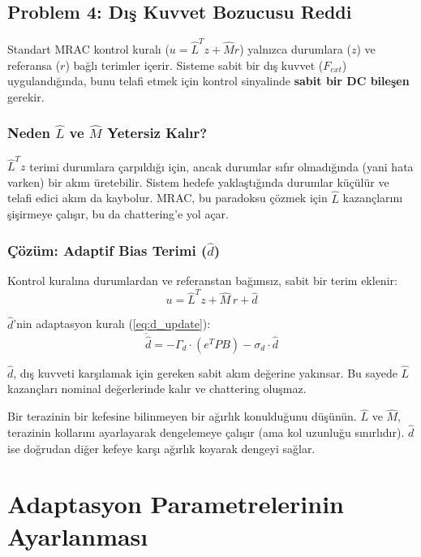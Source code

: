 \documentclass[12pt,a4paper]{article}
\begin{document}
\subsection{Problem 4: Dış Kuvvet Bozucusu Reddi}
\label{subsec:disturbance}

Standart MRAC kontrol kuralı ($u = \hat{L}^T z + \hat{M} r$) yalnızca durumlara ($z$) ve referansa ($r$) bağlı terimler içerir. Sisteme sabit bir dış kuvvet ($F_{ext}$) uygulandığında, bunu telafi etmek için kontrol sinyalinde \textbf{sabit bir DC bileşen} gerekir.

\subsubsection{Neden $\hat{L}$ ve $\hat{M}$ Yetersiz Kalır?}
$\hat{L}^T z$ terimi durumlara çarpıldığı için, ancak durumlar sıfır olmadığında (yani hata varken) bir akım üretebilir. Sistem hedefe yaklaştığında durumlar küçülür ve telafi edici akım da kaybolur. MRAC, bu paradoksu çözmek için $\hat{L}$ kazançlarını şişirmeye çalışır, bu da chattering'e yol açar.

\subsubsection{Çözüm: Adaptif Bias Terimi ($\hat{d}$)}
Kontrol kuralına durumlardan ve referanstan bağımsız, sabit bir terim eklenir:
\begin{equation}
    u = \hat{L}^T z + \hat{M}\,r + \hat{d}
\end{equation}

$\hat{d}$'nin adaptasyon kuralı (\ref{eq:d_update}):
\begin{equation}
    \dot{\hat{d}} = -\Gamma_d \cdot (e^T P B) - \sigma_d \cdot \hat{d}
\end{equation}

$\hat{d}$, dış kuvveti karşılamak için gereken sabit akım değerine yakınsar. Bu sayede $\hat{L}$ kazançları nominal değerlerinde kalır ve chattering oluşmaz.

\begin{cozum}
Bir terazinin bir kefesine bilinmeyen bir ağırlık konulduğunu düşünün. $\hat{L}$ ve $\hat{M}$, terazinin kollarını ayarlayarak dengelemeye çalışır (ama kol uzunluğu sınırlıdır). $\hat{d}$ ise doğrudan diğer kefeye karşı ağırlık koyarak dengeyi sağlar.
\end{cozum}

\section{Adaptasyon Parametrelerinin Ayarlanması}
\label{sec:tuning}
\end{document}
